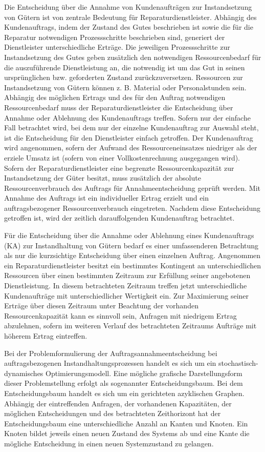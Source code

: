 Die Entscheidung über die Annahme von Kundenaufträgen zur Instandsetzung von Gütern ist von zentrale Bedeutung für Reparaturdienstleister. Abhängig des Kundenauftrags, indem der Zustand des Gutes beschrieben ist sowie die für die Reparatur notwendigen Prozessschritte beschrieben sind, generiert der Dienstleister unterschiedliche Erträge. Die jeweiligen Prozessschritte zur Instandsetzung des Gutes geben zusätzlich den notwendigen Ressourcenbedarf für die auszuführende Dienstleistung an, die notwendig ist um das Gut in seinen ursprünglichen bzw. geforderten Zustand zurückzuversetzen. Ressourcen zur Instandsetzung von Gütern können z. B. Material oder Personalstunden sein. Abhängig des möglichen Ertrags und des für den Auftrag notwendigen Ressourcenbedarf muss der Reparaturdienstleister die Entscheidung über Annahme oder Ablehnung des Kundenauftrags treffen. Sofern nur der einfache Fall betrachtet wird, bei dem nur der einzelne Kundenauftrag zur Auswahl steht, ist die Entscheidung für den Dienstleister einfach getroffen. Der Kundenauftrag wird angenommen, sofern der Aufwand des Ressourceneinsatzes niedriger als der erziele Umsatz ist (sofern von einer Vollkostenrechnung ausgegangen wird). Sofern der Reparaturdienstleister eine begrenzte Ressourcenkapazität zur Instandsetzung der Güter besitzt, muss zusätzlich der absolute Ressourcenverbrauch des Auftrags für Annahmeentscheidung geprüft werden. Mit Annahme des Auftrags ist ein individueller Ertrag erzielt und ein auftragsbezogener Ressourcenverbrauch eingetreten. Nachdem diese Entscheidung getroffen ist, wird der zeitlich darauffolgenden Kundenauftrag betrachtet.

Für die Entscheidung über die Annahme oder Ablehnung eines Kundenauftrags (KA) zur Instandhaltung von Gütern bedarf es einer umfassenderen Betrachtung als nur die kurzsichtige Entscheidung über einen einzelnen Auftrag. Angenommen ein Reparaturdienstleister besitzt ein bestimmtes Kontingent an unterschiedlichen Ressourcen über einen bestimmten Zeitraum zur Erfüllung seiner angebotenen Dienstleistung. In diesem betrachteten Zeitraum treffen jetzt unterschiedliche Kundenaufträge mit unterschiedlicher Wertigkeit ein. Zur Maximierung seiner Erträge über diesen Zeitraum unter Beachtung der vorhanden Ressourcenkapazität kann es sinnvoll sein, Anfragen mit niedrigem Ertrag abzulehnen, sofern im weiteren Verlauf des betrachteten Zeitraums Aufträge mit höherem Ertrag eintreffen.

Bei der Problemformulierung der Auftragsannahmeentscheidung bei auftragsbezogenen Instandhaltungsprozessen handelt es sich um ein stochastisch-dynamisches Optimierungsmodell. Eine mögliche grafische Darstellungsform dieser Problemstellung erfolgt als sogenannter Entscheidungsbaum. Bei dem Entscheidungsbaum handelt es sich um ein gerichteten azyklischen Graphen. Abhängig der eintreffenden Anfragen, der vorhandenen Kapazitäten, der möglichen Entscheidungen und des betrachteten Zeithorizont hat der Entscheidungsbaum eine unterschiedliche Anzahl an Kanten und Knoten. Ein Knoten bildet jeweils einen neuen Zustand des Systems ab und eine Kante die mögliche Entscheidung in einen neuen Systemzustand zu gelangen.


